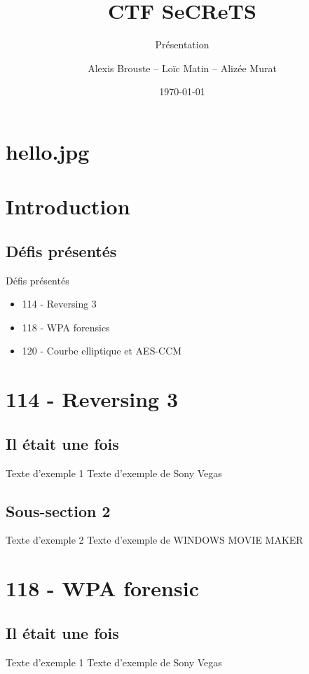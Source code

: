 \documentclass[10pt,sans,usenames,dvipsnames,french,compress]{beamer}
\title{CTF SeCReTS}
\subtitle{Présentation}
\author{Alexis Brouste -- Loïc Matin -- Alizée Murat}
\date{\today{}}
\institute[UVSQ]{UVSQ}
\begin{document}
\section{hello.jpg}
\begin{frame}[plain]
	\titlepage
\end{frame}

\section{Introduction}
\subsection{Défis présentés}
\begin{frame}{Défis présentés}
	\begin{itemize}
		\item 114 - Reversing 3
		\item 118 - WPA forensics
		\item 120 - Courbe elliptique et AES-CCM
	\end{itemize}
\end{frame}

\section{114 - Reversing 3}
\subsection{Il était une fois}
\begin{frame}{Texte d'exemple 1}
	Texte d'exemple de Sony Vegas
\end{frame}

\subsection{Sous-section 2}
\begin{frame}{Texte d'exemple 2}
	Texte d'exemple de WINDOWS MOVIE MAKER
\end{frame}

\section{118 - WPA forensic}
\subsection{Il était une fois}
\begin{frame}{Texte d'exemple 1}
	Texte d'exemple de Sony Vegas
\end{frame}
\end{document}
